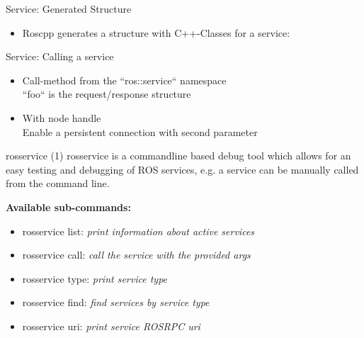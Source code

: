 \documentclass{beamer}
\begin{document}
\begin{frame}{Service: Generated Structure}
	\begin{itemize}
		\item Roscpp generates a structure with C++-Classes for a service:
			
	\end{itemize}
\end{frame}
\begin{frame}{Service: Calling a service}
	\begin{itemize}
		\item Call-method from the ``ros::service`` namespace\\
		``foo`` is the request/response structure
			
		\item With node handle\\
		Enable a persistent connection with second parameter
		
	\end{itemize}
\end{frame}
\begin{frame}{rosservice (1)}
	rosservice is a commandline based debug tool which allows for an easy testing and debugging of ROS services, e.g. a service can be manually called from the command line.
	\newline
	\newline
	\begin{large}\textbf{Available sub-commands:}\end{large}
	\begin{itemize}
		\item rosservice list:   \textit{ print information about active services}
		\item rosservice call:   \textit{call the service with the provided args}
		\item rosservice type:   \textit{print service type}    
		\item rosservice find:   \textit{find services by service type}
		\item rosservice uri:    \textit{ print service ROSRPC uri}
	\end{itemize}
\end{frame}
\end{document}
